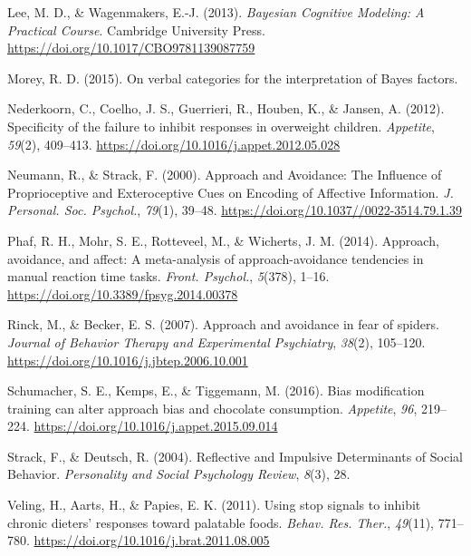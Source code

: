 \documentclass[man,floatsintext]{apa6}
\begin{document}
\hypertarget{ref-lee_bayesian_2013}{}
Lee, M. D., \& Wagenmakers, E.-J. (2013). \emph{Bayesian Cognitive
Modeling: A Practical Course}. Cambridge University Press.
\url{https://doi.org/10.1017/CBO9781139087759}

\hypertarget{ref-richard_d._morey_verbal_2015}{}
Morey, R. D. (2015). On verbal categories for the interpretation of
Bayes factors.

\hypertarget{ref-nederkoorn_specificity_2012}{}
Nederkoorn, C., Coelho, J. S., Guerrieri, R., Houben, K., \& Jansen, A.
(2012). Specificity of the failure to inhibit responses in overweight
children. \emph{Appetite}, \emph{59}(2), 409--413.
\url{https://doi.org/10.1016/j.appet.2012.05.028}

\hypertarget{ref-neumann_approach_2000}{}
Neumann, R., \& Strack, F. (2000). Approach and Avoidance: The Influence
of Proprioceptive and Exteroceptive Cues on Encoding of Affective
Information. \emph{J. Personal. Soc. Psychol.}, \emph{79}(1), 39--48.
\url{https://doi.org/10.1037//0022-3514.79.1.39}

\hypertarget{ref-phaf_approach_2014}{}
Phaf, R. H., Mohr, S. E., Rotteveel, M., \& Wicherts, J. M. (2014).
Approach, avoidance, and affect: A meta-analysis of approach-avoidance
tendencies in manual reaction time tasks. \emph{Front. Psychol.},
\emph{5}(378), 1--16. \url{https://doi.org/10.3389/fpsyg.2014.00378}

\hypertarget{ref-rinck_approach_2007}{}
Rinck, M., \& Becker, E. S. (2007). Approach and avoidance in fear of
spiders. \emph{Journal of Behavior Therapy and Experimental Psychiatry},
\emph{38}(2), 105--120.
\url{https://doi.org/10.1016/j.jbtep.2006.10.001}

\hypertarget{ref-schumacher_bias_2016}{}
Schumacher, S. E., Kemps, E., \& Tiggemann, M. (2016). Bias modification
training can alter approach bias and chocolate consumption.
\emph{Appetite}, \emph{96}, 219--224.
\url{https://doi.org/10.1016/j.appet.2015.09.014}

\hypertarget{ref-strack_reflective_2004}{}
Strack, F., \& Deutsch, R. (2004). Reflective and Impulsive Determinants
of Social Behavior. \emph{Personality and Social Psychology Review},
\emph{8}(3), 28.

\hypertarget{ref-veling_using_2011}{}
Veling, H., Aarts, H., \& Papies, E. K. (2011). Using stop signals to
inhibit chronic dieters' responses toward palatable foods. \emph{Behav.
Res. Ther.}, \emph{49}(11), 771--780.
\url{https://doi.org/10.1016/j.brat.2011.08.005}
\end{document}

